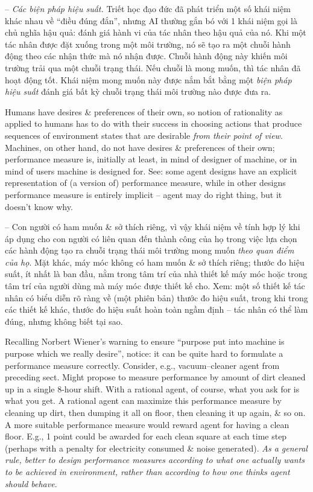 \documentclass{article}
\begin{document}
\begin{itemize}
\begin{itemize}
\begin{itemize}
\begin{itemize}
				-- {\it Các biện pháp hiệu suất.} Triết học đạo đức đã phát triển một số khái niệm khác nhau về ``điều đúng đắn'', nhưng AI thường gắn bó với 1 khái niệm gọi là chủ nghĩa hậu quả: đánh giá hành vi của tác nhân theo hậu quả của nó. Khi một tác nhân được đặt xuống trong một môi trường, nó sẽ tạo ra một chuỗi hành động theo các nhận thức mà nó nhận được. Chuỗi hành động này khiến môi trường trải qua một chuỗi trạng thái. Nếu chuỗi là mong muốn, thì tác nhân đã hoạt động tốt. Khái niệm mong muốn này được nắm bắt bằng một {\it biện pháp hiệu suất} đánh giá bất kỳ chuỗi trạng thái môi trường nào được đưa ra.
				
				Humans have desires \& preferences of their own, so notion of rationality as applied to humans has to do with their success in choosing actions that produce sequences of environment states that are desirable {\it from their point of view}. Machines, on other hand, do not have desires \& preferences of their own; performance measure is, initially at least, in mind of designer of machine, or in mind of users machine is designed for. See: some agent designs have an explicit representation of (a version of) performance measure, while in other designs performance measure is entirely implicit -- agent may do right thing, but it doesn't know why.
				
				-- Con người có ham muốn \& sở thích riêng, vì vậy khái niệm về tính hợp lý khi áp dụng cho con người có liên quan đến thành công của họ trong việc lựa chọn các hành động tạo ra chuỗi trạng thái môi trường mong muốn {\it theo quan điểm của họ}. Mặt khác, máy móc không có ham muốn \& sở thích riêng; thước đo hiệu suất, ít nhất là ban đầu, nằm trong tâm trí của nhà thiết kế máy móc hoặc trong tâm trí của người dùng mà máy móc được thiết kế cho. Xem: một số thiết kế tác nhân có biểu diễn rõ ràng về (một phiên bản) thước đo hiệu suất, trong khi trong các thiết kế khác, thước đo hiệu suất hoàn toàn ngầm định -- tác nhân có thể làm đúng, nhưng không biết tại sao.
				
				Recalling {\sc Norbert Wiener}'s warning to ensure ``purpose put into machine is purpose which we really desire'', notice: it can be quite hard to formulate a performance measure correctly. Consider, e.g., vacuum--cleaner agent from preceding sect. Might propose to measure performance by amount of dirt cleaned up in a single 8-hour shift. With a rational agent, of course, what you ask for is what you get. A rational agent can maximize this performance measure by cleaning up dirt, then dumping it all on floor, then cleaning it up again, \& so on. A more suitable performance measure would reward agent for having a clean floor. E.g., 1 point could be awarded for each clean square at each time step (perhaps with a penalty for electricity consumed \& noise generated). {\it As a general rule, better to design performance measures according to what one actually wants to be achieved in environment, rather than according to how one thinks agent should behave}.
				

\end{itemize}
\end{itemize}
\end{itemize}
\end{itemize}
\end{document}
